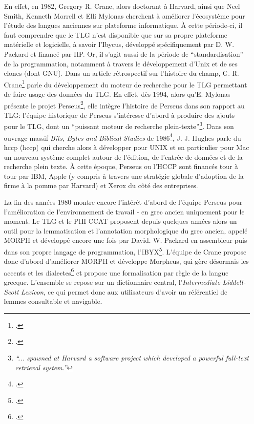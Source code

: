 En effet, en 1982, Gregory R. Crane, alors doctorant à Harvard, ainsi que Neel Smith, Kenneth Morrell et Elli Mylonas cherchent à améliorer l'écosystème pour l'étude des langues anciennes sur plateforme informatique. À cette période-ci, il faut comprendre que le TLG n'est disponible que sur sa propre plateforme matérielle et logicielle, à savoir l'Ibycus, développé spécifiquement par D. W. Packard et financé par HP. Or, il s'agit aussi de la période de \enquote{standardisation} de la programmation, notamment à travers le développement d'Unix et de ses clones (dont GNU). Dans un article rétrospectif sur l'histoire du champ, G. R. Crane\footcite{schreibman_classics_2004} parle du développement du moteur de recherche pour le TLG permettant de faire usage des données du TLG. En effet, dès 1994, alors qu'E. Mylonas présente le projet Perseus\footcite{mylonas_perseus_1993}, elle intègre l'histoire de Perseus dans son rapport au TLG: l'équipe historique de Perseus s'intéresse d'abord à produire des ajouts pour le TLG, dont un \enquote{puissant moteur de recherche plein-texte}\footnote{\textit{\enquote{... spawned at Harvard a software project which developed a powerful full-text retrieval system.}}}. Dans son ouvrage massif \textit{Bits, Bytes and Biblical Studies} de 1986\footcite[p. 598]{hughes_bits_1987}, J. J. Hughes parle du \acrfull{hccp} (\acrshort{hccp}) qui cherche alors à développer pour UNIX et en particulier pour Mac un nouveau système complet autour de l'édition, de l'entrée de données et de la recherche plein texte. À cette époque, Perseus ou l'HCCP sont financés tour à tour par IBM, Apple (y compris à travers une stratégie globale d'adoption de la firme à la pomme par Harvard) et Xerox du côté des entreprises.

La fin des années 1980 montre encore l'intérêt d'abord de l'équipe Perseus pour l'amélioration de l'environnement de travail - en grec ancien uniquement pour le moment. Le TLG et le PHI-CCAT proposent depuis quelques années alors un outil pour la lemmatisation et l'annotation morphologique du grec ancien, appelé MORPH et développé encore une fois par David. W. Packard en assembleur puis dans son propre langage de programmation, l'IBYX\footcite[p.554-555]{hughes_bits_1987}. L'équipe de Crane propose donc d'abord d'améliorer MORPH et développe Morpheus, qui gère désormais les accents et les dialectes\footcite{mylonas_perseus_1993} et propose une formalisation par règle de la langue grecque. L'ensemble se repose sur un dictionnaire central, l'\textit{Intermediate Liddell-Scott Lexicon}, ce qui permet donc aux utilisateurs d'avoir un référentiel de lemmes consultable et navigable.

